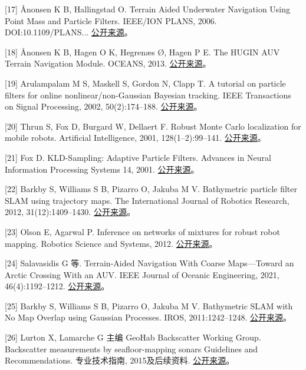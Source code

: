 {[}17{]} Ånonsen K B, Hallingstad O. Terrain Aided Underwater Navigation Using Point Mass and Particle Filters. IEEE/ION PLANS, 2006. DOI:10.1109/\allowbreak PLANS... \href{https://www.navlab.net/Publications/Terrain_Aided_Underwater_Navigation_Using_Point_Mass_And_Particle_Filters.pdf}{公开来源}。

{[}18{]} Ånonsen K B, Hagen O K, Hegrenæs Ø, Hagen P E. The HUGIN AUV Terrain Navigation Module. OCEANS, 2013. \href{https://www.navlab.net/Publications/The_HUGIN_AUV_Terrain_Navigation_Module.pdf}{公开来源}。

{[}19{]} Arulampalam M S, Maskell S, Gordon N, Clapp T. A tutorial on particle filters for online nonlinear/non-Gaussian Bayesian tracking. IEEE Transactions on Signal Processing, 2002, 50(2):174--188. \href{https://doi.org/10.1109/78.978374}{公开来源}。

{[}20{]} Thrun S, Fox D, Burgard W, Dellaert F. Robust Monte Carlo localization for mobile robots. Artificial Intelligence, 2001, 128(1--2):99--141. \href{https://www.borg.cc.gatech.edu/projects/monte-carlo-localization.html}{公开来源}。

{[}21{]} Fox D. KLD-Sampling: Adaptive Particle Filters. Advances in Neural Information Processing Systems 14, 2001. \href{https://papers.neurips.cc/paper_files/paper/2001/hash/c5b2cebf15b205503560c4e8e6d1ea78-Abstract.html}{公开来源}。

{[}22{]} Barkby S, Williams S B, Pizarro O, Jakuba M V. Bathymetric particle filter SLAM using trajectory maps. The International Journal of Robotics Research, 2012, 31(12):1409--1430. \href{https://doi.org/10.1177/0278364912459666}{公开来源}。

{[}23{]} Olson E, Agarwal P. Inference on networks of mixtures for robust robot mapping. Robotics Science and Systems, 2012. \href{https://april.eecs.umich.edu/media/pdfs/olson2012rss.pdf}{公开来源}。

{[}24{]} Salavasidis G 等. Terrain-Aided Navigation With Coarse Maps---Toward an Arctic Crossing With an AUV. IEEE Journal of Oceanic Engineering, 2021, 46(4):1192--1212. \href{https://eprints.soton.ac.uk/480480/1/joe.pdf}{公开来源}。

{[}25{]} Barkby S, Williams S B, Pizarro O, Jakuba M V. Bathymetric SLAM with No Map Overlap using Gaussian Processes. IROS, 2011:1242--1248. \href{https://www-personal.acfr.usyd.edu.au/sbarkby/2011_iros_bpslam.pdf}{公开来源}。

{[}26{]} Lurton X, Lamarche G 主编 GeoHab Backscatter Working Group. Backscatter measurements by seafloor-mapping sonars Guidelines and Recommendations. 专业技术指南, 2015及后续资料. \href{https://geohab.org/backscatter-working-group/}{公开来源}。

